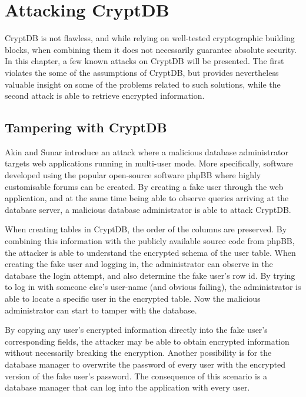 \chapter{Attacking CryptDB}
\label{chp:attacks}

CryptDB is not flawless, and while relying on well-tested cryptographic building blocks, when combining them it does not necessarily guarantee absolute security. In this chapter, a few known attacks on CryptDB will be presented. The first violates the some of the assumptions of CryptDB, but provides nevertheless valuable insight on some of the problems related to such solutions, while the second attack is able to retrieve encrypted information.

\section{Tampering with CryptDB}

Akin and Sunar \cite{akin_2014} introduce an attack where a malicious database administrator targets web applications running in multi-user mode. More specifically, software developed using the popular open-source software phpBB \cite{phpBB} where highly customisable forums can be created. By creating a fake user through the web application, and at the same time being able to observe queries arriving at the database server, a malicious database administrator is able to attack CryptDB.

When creating tables in CryptDB, the order of the columns are preserved. By combining this information with the publicly available source code from phpBB, the attacker is able to understand the encrypted schema of the user table. When creating the fake user and logging in, the administrator can observe in the database the login attempt, and also determine the fake user's row id. By trying to log in with someone else's user-name (and obvious failing), the administrator is able to locate a specific user in the encrypted table. Now the malicious administrator can start to tamper with the database.

By copying any user's encrypted information directly into the fake user's corresponding fields, the attacker may be able to obtain encrypted information without necessarily breaking the encryption. Another possibility is for the database manager to overwrite the password of every user with the encrypted version of the fake user's password. The consequence of this scenario is a database manager that can log into the application with every user.

